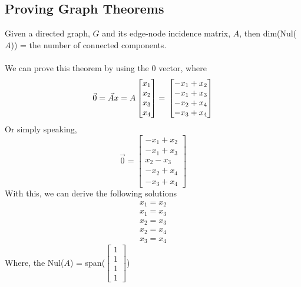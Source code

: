 \subsection{Proving Graph Theorems}
Given a directed graph, $G$ and its edge-node incidence matrix, $A$, 
then dim(Nul($A$)) = the number of connected components. \\\\
We can prove this theorem by using the 0 vector, where
\[
  \vec{0} = \vec{A}x = A \begin{bmatrix} x_1 \\ x_2 \\ x_3 \\ x_4 \end{bmatrix} = \\
  \begin{bmatrix} -x_1 + x_2 \\ -x_1 + x_3 \\ -x_2 + x_4 \\ -x_3 + x_4 \end{bmatrix}
\]
Or simply speaking, 
\[
  \vec{0} = 
  \begin{bmatrix} -x_1 + x_2 \\ -x_1 + x_3 \\ x_2 - x_3 \\ -x_2 + x_4 \\ -x_3 + x_4 \end{bmatrix}
\]
With this, we can derive the following solutions 
\[
\begin{aligned}
  x_1 = x_2 \\
  x_1 = x_3 \\ 
  x_2 = x_3 \\
  x_2 = x_4 \\
  x_3 = x_4
\end{aligned}
\]
Where, the Nul($A$) = span($\begin{bmatrix} 1 \\ 1 \\ 1 \\ 1 \end{bmatrix}$) 
